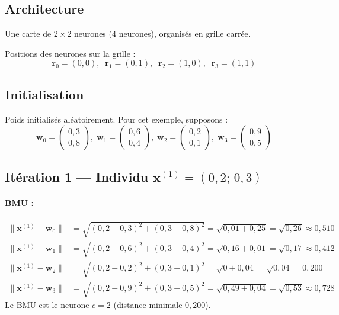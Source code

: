 \documentclass[a4paper,11pt]{article}
\theoremstyle{definition}
\begin{document}
\subsection{Architecture}
Une carte de $2 \times 2$ neurones (4 neurones), organisés en grille carrée.

Positions des neurones sur la grille :
\[
\mathbf{r}_0 = (0,0),\;\; \mathbf{r}_1 = (0,1),\;\;
\mathbf{r}_2 = (1,0),\;\; \mathbf{r}_3 = (1,1)
\]

\subsection{Initialisation}
Poids initialisés aléatoirement. Pour cet exemple, supposons :
\[
\mathbf{w}_0 = \begin{pmatrix}0,3\\0,8\end{pmatrix},\;
\mathbf{w}_1 = \begin{pmatrix}0,6\\0,4\end{pmatrix},\;
\mathbf{w}_2 = \begin{pmatrix}0,2\\0,1\end{pmatrix},\;
\mathbf{w}_3 = \begin{pmatrix}0,9\\0,5\end{pmatrix}
\]

\subsection{Itération 1 — Individu $\mathbf{x}^{(1)} = (0{,}2;\,0{,}3)$}

\paragraph{BMU :}
\begin{align*}
\|\mathbf{x}^{(1)} - \mathbf{w}_0\| &= \sqrt{(0{,}2-0{,}3)^2 + (0{,}3-0{,}8)^2} = \sqrt{0{,}01+0{,}25} = \sqrt{0{,}26} \approx 0{,}510 \\
\|\mathbf{x}^{(1)} - \mathbf{w}_1\| &= \sqrt{(0{,}2-0{,}6)^2 + (0{,}3-0{,}4)^2} = \sqrt{0{,}16+0{,}01} = \sqrt{0{,}17} \approx 0{,}412 \\
\|\mathbf{x}^{(1)} - \mathbf{w}_2\| &= \sqrt{(0{,}2-0{,}2)^2 + (0{,}3-0{,}1)^2} = \sqrt{0+0{,}04} = \sqrt{0{,}04} = 0{,}200 \\
\|\mathbf{x}^{(1)} - \mathbf{w}_3\| &= \sqrt{(0{,}2-0{,}9)^2 + (0{,}3-0{,}5)^2} = \sqrt{0{,}49+0{,}04} = \sqrt{0{,}53} \approx 0{,}728
\end{align*}
Le BMU est le neurone $c = 2$ (distance minimale $0{,}200$).
\end{document}
